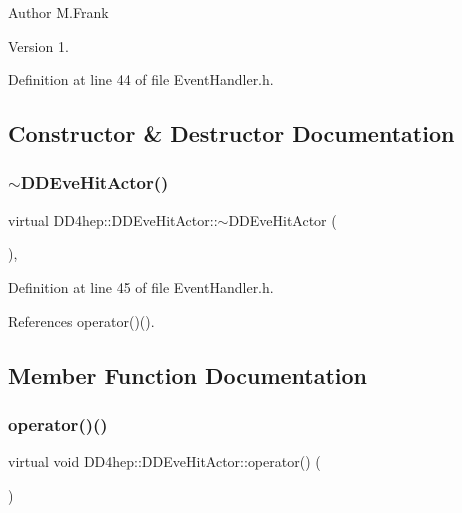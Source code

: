 \begin{DoxyAuthor}{Author}
M.\+Frank 
\end{DoxyAuthor}
\begin{DoxyVersion}{Version}
1. 
\end{DoxyVersion}


Definition at line 44 of file Event\+Handler.\+h.



\subsection{Constructor \& Destructor Documentation}
\hypertarget{struct_d_d4hep_1_1_d_d_eve_hit_actor_a9706da47b8da6351434ea0f9d41d19d4}{}\label{struct_d_d4hep_1_1_d_d_eve_hit_actor_a9706da47b8da6351434ea0f9d41d19d4} 
\subsubsection{\texorpdfstring{$\sim$\+D\+D\+Eve\+Hit\+Actor()}{~DDEveHitActor()}}
{\footnotesize\ttfamily virtual D\+D4hep\+::\+D\+D\+Eve\+Hit\+Actor\+::$\sim$\+D\+D\+Eve\+Hit\+Actor (\begin{DoxyParamCaption}{ }\end{DoxyParamCaption})\hspace{0.3cm}{\ttfamily [inline]}, {\ttfamily [virtual]}}



Definition at line 45 of file Event\+Handler.\+h.



References operator()().



\subsection{Member Function Documentation}
\hypertarget{struct_d_d4hep_1_1_d_d_eve_hit_actor_a612a0a84bfe41620203555b044019788}{}\label{struct_d_d4hep_1_1_d_d_eve_hit_actor_a612a0a84bfe41620203555b044019788} 
\subsubsection{\texorpdfstring{operator()()}{operator()()}}
{\footnotesize\ttfamily virtual void D\+D4hep\+::\+D\+D\+Eve\+Hit\+Actor\+::operator() (\begin{DoxyParamCaption}\item[{const \hyperlink{class_d_d4hep_1_1_d_d_eve_hit}{D\+D\+Eve\+Hit} \&}]{ }\end{DoxyParamCaption})\hspace{0.3cm}{\ttfamily [pure virtual]}}



